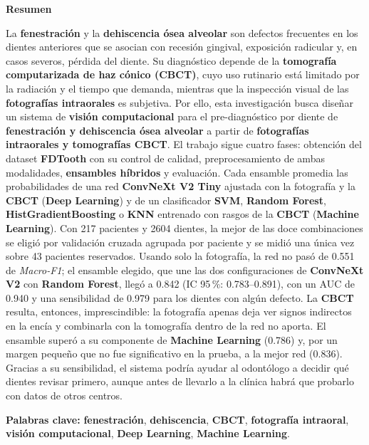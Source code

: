 \documentclass[12pt,a4paper]{article}
\newcommand{\prob}[1]{\textcolor{problema}{\textbf{#1}}}
\newcommand{\sol}[1]{\textcolor{solucion}{\textbf{#1}}}
\newcommand{\dat}[1]{\textcolor{dataset}{\textbf{#1}}}
\newcommand{\prob}[1]{#1}
\newcommand{\sol}[1]{#1}
\newcommand{\dat}[1]{#1}
\begin{document}
\begin{center}\textbf{Resumen}\end{center}
La \prob{fenestración} y la \prob{dehiscencia ósea alveolar} son defectos
frecuentes en los dientes anteriores que se asocian con recesión gingival,
exposición radicular y, en casos severos, pérdida del diente. Su
diagnóstico depende de la \dat{tomografía computarizada de haz cónico
(CBCT)}, cuyo uso rutinario está limitado por la radiación y el tiempo que
demanda, mientras que la inspección visual de las \dat{fotografías
intraorales} es subjetiva. Por ello, esta investigación busca diseñar un
sistema de \sol{visión computacional} para el pre-diagnóstico por diente
de \prob{fenestración y dehiscencia ósea alveolar} a partir de
\dat{fotografías intraorales y tomografías CBCT}. El trabajo sigue cuatro
fases: obtención del dataset \dat{FDTooth} con su control de calidad,
preprocesamiento de ambas modalidades, \sol{ensambles híbridos} y
evaluación. Cada ensamble promedia las probabilidades de una red
\sol{ConvNeXt V2 Tiny} ajustada con la fotografía y la \dat{CBCT}
(\sol{Deep Learning}) y de un clasificador \sol{SVM}, \sol{Random Forest},
\sol{HistGradientBoosting} o \sol{KNN} entrenado con rasgos de la
\dat{CBCT} (\sol{Machine Learning}). Con 217 pacientes y 2604 dientes, la
mejor de las doce combinaciones se eligió por validación cruzada agrupada
por paciente y se midió una única vez sobre 43 pacientes reservados.
Usando solo la fotografía, la red no pasó de 0.551 de
\textit{Macro-F1}; el ensamble elegido, que une las dos configuraciones de
\sol{ConvNeXt V2} con \sol{Random Forest}, llegó a 0.842 (IC 95\,\%:
0.783--0.891), con un AUC de 0.940 y una sensibilidad de 0.979 para los
dientes con algún defecto. La \dat{CBCT} resulta, entonces,
imprescindible: la fotografía apenas deja ver signos indirectos en la
encía y combinarla con la tomografía dentro de la red no aporta. El
ensamble superó a su componente de \sol{Machine Learning} (0.786) y, por
un margen pequeño que no fue significativo en la prueba, a la mejor red
(0.836). Gracias a su sensibilidad, el sistema podría
ayudar al odontólogo a decidir qué dientes revisar primero, aunque antes
de llevarlo a la clínica habrá que probarlo con datos de otros centros.

\noindent\textbf{Palabras clave:} \prob{fenestración}, \prob{dehiscencia},
\dat{CBCT}, \dat{fotografía intraoral}, \sol{visión computacional},
\sol{Deep Learning}, \sol{Machine Learning}.
\end{document}
